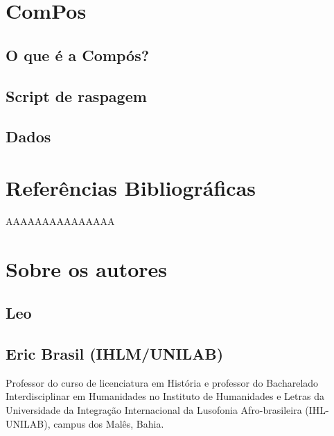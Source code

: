 \documentclass[
]{book}
\begin{document}
\hypertarget{compos}{%
\chapter{ComPos}\label{compos}}

\hypertarget{o-que-uxe9-a-compuxf3s}{%
\section{O que é a Compós?}\label{o-que-uxe9-a-compuxf3s}}

\hypertarget{script-de-raspagem-1}{%
\section{Script de raspagem}\label{script-de-raspagem-1}}

\hypertarget{dados-3}{%
\section{Dados}\label{dados-3}}

\hypertarget{referuxeancias-bibliogruxe1ficas}{%
\chapter{Referências Bibliográficas}\label{referuxeancias-bibliogruxe1ficas}}

AAAAAAAAAAAAAAA

\hypertarget{sobre-os-autores}{%
\chapter{Sobre os autores}\label{sobre-os-autores}}

\hypertarget{leo}{%
\section{Leo}\label{leo}}

\hypertarget{eric-brasil-ihlmunilab}{%
\section{Eric Brasil (IHLM/UNILAB)}\label{eric-brasil-ihlmunilab}}

Professor do curso de licenciatura em História e professor do Bacharelado Interdisciplinar em Humanidades no Instituto de Humanidades e Letras da Universidade da Integração Internacional da Lusofonia Afro-brasileira (IHL-UNILAB), campus dos Malês, Bahia.
\end{document}

